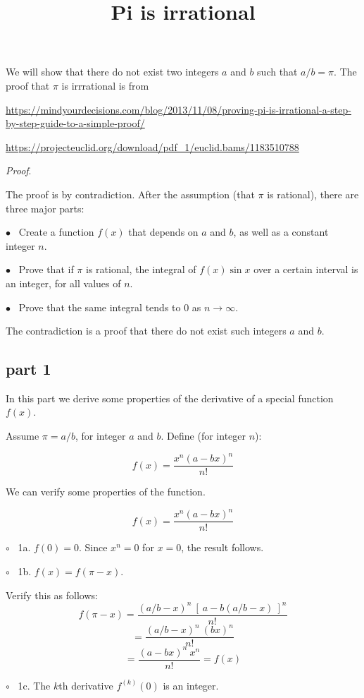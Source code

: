 \documentclass[11pt, oneside]{article}
\title{Pi is irrational}
\date{}
\begin{document}
\maketitle
\Large


We will show that there do not exist two integers $a$ and $b$ such that $a/b = \pi$.  The proof that $\pi$ is irrrational is from 

\url{https://mindyourdecisions.com/blog/2013/11/08/proving-pi-is-irrational-a-step-by-step-guide-to-a-simple-proof/}

\url{https://projecteuclid.org/download/pdf_1/euclid.bams/1183510788}

\emph{Proof}.

The proof is by contradiction.  After the assumption (that $\pi$ is rational), there are three major parts:

$\bullet$ \ Create a function $f(x)$ that depends on $a$ and $b$, as well as a constant integer $n$.

$\bullet$ \ Prove that if $\pi$ is rational, the integral of $f(x) \sin x$ over a certain interval is an integer, for all values of $n$.

$\bullet$ \ Prove that the same integral tends to $0$ as $n \rightarrow \infty$.

The contradiction is a proof that there do not exist such integers $a$ and $b$.

\subsection*{part 1}
In this part we derive some properties of the derivative of a special function $f(x)$.

Assume $\pi = a/b$, for integer $a$ and $b$.  Define (for integer $n$):

\[ f(x) = \frac{x^n (a-bx)^n}{n!} \]

We can verify some properties of the function.

\[ f(x) = \frac{x^n (a-bx)^n}{n!} \]

$\circ$ \ 1a.  $f(0) = 0$.  Since $x^n = 0$ for $x = 0$, the result follows.

$\circ$ \ 1b.  $f(x) = f(\pi - x)$.  

Verify this as follows:
\[ f(\pi - x) = \frac{(a/b - x)^n \ [ \ a-b(a/b - x) \ ]^n}{n!} \]
\[ = \frac{(a/b - x)^n \ (bx)^n}{n!} \]
\[ = \frac{(a - bx)^n \ x^n}{n!} = f(x) \]

$\circ$ \ 1c.  The $k$th derivative $f^{(k)}(0)$ is an integer.
\end{document}
